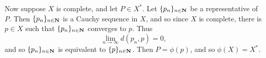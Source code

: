 \begin{ex}
\begin{enumerate}
Now suppose $X$ is complete, and let $P \in X^*$. Let $\{p_n\}_{n \in \mathbf{N}}$ be a representative of $P$. Then $\{p_n\}_{n \in \mathbf{N}}$ is a Cauchy sequence in $X$, and so since $X$ is complete, there is $p \in X$ such that $\{p_n\}_{n \in \mathbf{N}}$ converges to $p$. Thus \[\lim_{n\to\infty}d(p_n, p) = 0,\] and so $\{p_n\}_{n \in \mathbf{N}}$ is equivalent to $\{p\}_{n \in \mathbf{N}}$. Then $P = \phi(p)$, and so $\phi(X) = X^*$.
\end{enumerate}
\end{ex}

\begin{ex}

\end{ex}